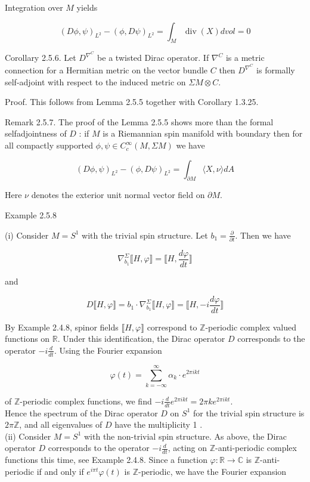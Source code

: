\documentclass[10pt, letterpaper]{article}
\begin{document}
Integration over $M$ yields

$$
(D \phi, \psi)_{L^{2}}-(\phi, D \psi)_{L^{2}}=\int_{M} \operatorname{div}(X) d v o l=0
$$

Corollary 2.5.6. Let $D^{\nabla^{C}}$ be a twisted Dirac operator. If $\nabla^{C}$ is a metric connection for a Hermitian metric on the vector bundle $C$ then $D^{\nabla^{C}}$ is formally self-adjoint with respect to the induced metric on $\Sigma M \otimes C$.

Proof. This follows from Lemma 2.5.5 together with Corollary 1.3.25.

Remark 2.5.7. The proof of the Lemma 2.5.5 shows more than the formal selfadjointness of $D$ : if $M$ is a Riemannian spin manifold with boundary then for all compactly supported $\phi, \psi \in C_{c}^{\infty}(M, \Sigma M)$ we have

$$
(D \phi, \psi)_{L^{2}}-(\phi, D \psi)_{L^{2}}=\int_{\partial M}\langle X, \nu\rangle d A
$$

Here $\nu$ denotes the exterior unit normal vector field on $\partial M$.



Example 2.5.8

(i) Consider $M=S^{1}$ with the trivial spin structure. Let $b_{1}=\frac{\partial}{\partial t}$. Then we have

$$
\nabla_{b_{1}}^{\Sigma} \llbracket H, \varphi \rrbracket=\llbracket H, \frac{d \varphi}{d t} \rrbracket
$$

and

$$
D \llbracket H, \varphi \rrbracket=b_{1} \cdot \nabla_{b_{1}}^{\Sigma} \llbracket H, \varphi \rrbracket=\llbracket H,-i \frac{d \varphi}{d t} \rrbracket
$$

By Example 2.4.8, spinor fields $\llbracket H, \varphi \rrbracket$ correspond to $\mathbb{Z}$-periodic complex valued functions on $\mathbb{R}$. Under this identification, the Dirac operator $D$ corresponds to the operator $-i \frac{d}{d t}$. Using the Fourier expansion

$$
\varphi(t)=\sum_{k=-\infty}^{\infty} \alpha_{k} \cdot e^{2 \pi i k t}
$$

of $\mathbb{Z}$-periodic complex functions, we find $-i \frac{d}{d t} e^{2 \pi i k t}=2 \pi k e^{2 \pi i k t}$.\\
Hence the spectrum of the Dirac operator $D$ on $S^{1}$ for the trivial spin structure is $2 \pi \mathbb{Z}$, and all eigenvalues of $D$ have the multiplicity 1 .\\
(ii) Consider $M=S^{1}$ with the non-trivial spin structure. As above, the Dirac operator $D$ corresponds to the operator $-i \frac{d}{d t}$, acting on $\mathbb{Z}$-anti-periodic complex functions this time, see Example 2.4.8. Since a function $\varphi: \mathbb{R} \rightarrow \mathbb{C}$ is $\mathbb{Z}$-anti-periodic if and only if $e^{i \pi t} \varphi(t)$ is $\mathbb{Z}$-periodic, we have the Fourier expansion
\end{document}
